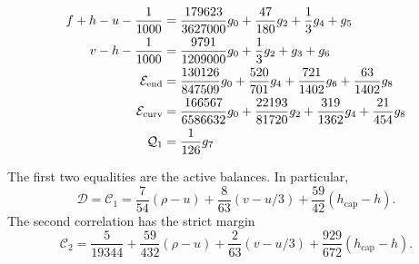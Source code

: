 \documentclass[11pt,a4paper]{article}
\numberwithin{equation}{section}
\theoremstyle{remark}
\newcommand{\hcap}{h_{\mathrm{cap}}}
\newcommand{\Qone}{\mathcal Q_1}
\begin{document}
\begin{align}
f+h-u-\frac1{1000} &= \frac{179623}{3627000}g_{0}+\frac{47}{180}g_{2}+\frac{1}{3}g_{4}+g_{5}\label{cert:main:11}\\
v-h-\frac1{1000} &= \frac{9791}{1209000}g_{0}+\frac{1}{3}g_{2}+g_{3}+g_{6}\label{cert:main:12}\\
\mathcal E_{\rm end} &= \frac{130126}{847509}g_{0}+\frac{520}{701}g_{4}+\frac{721}{1402}g_{6}+\frac{63}{1402}g_{8}\label{cert:main:13}\\
\mathcal E_{\rm curv} &= \frac{166567}{6586632}g_{0}+\frac{22193}{81720}g_{2}+\frac{319}{1362}g_{4}+\frac{21}{454}g_{8}\label{cert:main:14}\\
\Qone &= \frac{1}{126}g_{7}\label{cert:main:15}
\end{align}
\endgroup


The first two equalities are the active balances. In particular,
\[
 \mathcal D=\mathcal C_1
 =\frac7{54}(\rho-u)+\frac8{63}(v-u/3)
     +\frac{59}{42}(\hcap-h).
\]
The second correlation has the strict margin
\[
 \mathcal C_2=\frac5{19344}+\frac{59}{432}(\rho-u)
 +\frac2{63}(v-u/3)+\frac{929}{672}(\hcap-h).
\]
\end{document}
